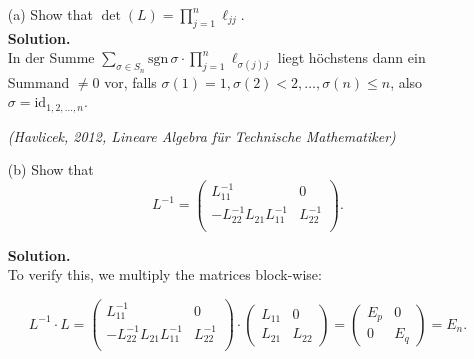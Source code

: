 \documentclass{article}
\begin{document}
\begin{itemize}
    \item[(a)] Show that $\det(L) = \prod_{j = 1}^n \ell_{jj}.$ \\
    
    \textbf{Solution.} \\
    In der Summe $\sum_{\sigma \in S_n} \text{sgn} \, \sigma \cdot \prod_{j = 1}^n \ell_{\sigma(j)j}$ liegt höchstens dann ein Summand $\neq 0$ vor, falls $\sigma(1) = 1, \sigma(2) < 2, \ldots, \sigma(n) \leq n$, also $\sigma = \text{id}_{1, 2, \ldots, n}$. 
    
    \textit{(Havlicek, 2012, Lineare Algebra für Technische Mathematiker)}
    
    \item[(b)] Show that
    \begin{equation*}
        L^{-1} = 
        \begin{pmatrix}
            L_{11}^{-1}                     & 0             \\
            -L_{22}^{-1}L_{21}L_{11}^{-1}   & L_{22}^{-1}   \\
        \end{pmatrix}
        \text{.}
    \end{equation*}
    
    \textbf{Solution.} \\
    To verify this, we multiply the matrices block-wise:
    
    \begin{equation*}
        L^{-1} \cdot L = 
        \begin{pmatrix}
            L_{11}^{-1}                     & 0             \\
            -L_{22}^{-1}L_{21}L_{11}^{-1}   & L_{22}^{-1}   \\
        \end{pmatrix}
        \cdot
        \begin{pmatrix}
            L_{11} & 0 \\
            L_{21} & L_{22}
        \end{pmatrix}
        =
        \begin{pmatrix}
            E_p &   0   \\
            0   &   E_q
        \end{pmatrix}
        = E_n \text{.}
    \end{equation*} \\
\end{itemize}
\end{document}
